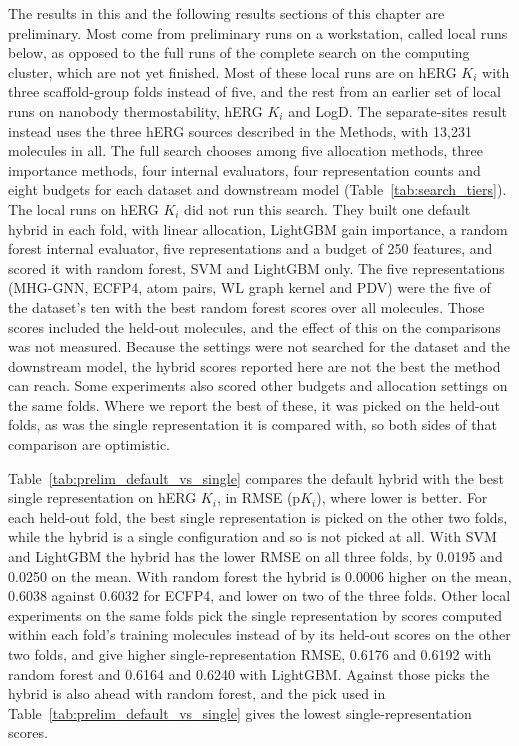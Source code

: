 \label{sec:method:results_single}


The results in this and the following results sections of this chapter are preliminary. Most come from preliminary runs on a workstation, called local runs below, as opposed to the full runs of the complete search on the computing cluster, which are not yet finished. Most of these local runs are on hERG $K_i$ with three scaffold-group folds instead of five, and the rest from an earlier set of local runs on nanobody thermostability, hERG $K_i$ and LogD. The separate-sites result instead uses the three hERG sources described in the Methods, with 13,231 molecules in all. The full search chooses among five allocation methods, three importance methods, four internal evaluators, four representation counts and eight budgets for each dataset and downstream model (Table~\ref{tab:search_tiers}). The local runs on hERG $K_i$ did not run this search. They built one default hybrid in each fold, with linear allocation, LightGBM gain importance, a random forest internal evaluator, five representations and a budget of 250 features, and scored it with random forest, SVM and LightGBM only. The five representations (MHG-GNN, ECFP4, atom pairs, WL graph kernel and PDV) were the five of the dataset's ten with the best random forest scores over all molecules. Those scores included the held-out molecules, and the effect of this on the comparisons was not measured. Because the settings were not searched for the dataset and the downstream model, the hybrid scores reported here are not the best the method can reach. Some experiments also scored other budgets and allocation settings on the same folds. Where we report the best of these, it was picked on the held-out folds, as was the single representation it is compared with, so both sides of that comparison are optimistic.

Table~\ref{tab:prelim_default_vs_single} compares the default hybrid with the best single representation on hERG $K_i$, in RMSE (p$K_i$), where lower is better. For each held-out fold, the best single representation is picked on the other two folds, while the hybrid is a single configuration and so is not picked at all. With SVM and LightGBM the hybrid has the lower RMSE on all three folds, by 0.0195 and 0.0250 on the mean. With random forest the hybrid is 0.0006 higher on the mean, 0.6038 against 0.6032 for ECFP4, and lower on two of the three folds. Other local experiments on the same folds pick the single representation by scores computed within each fold's training molecules instead of by its held-out scores on the other two folds, and give higher single-representation RMSE, 0.6176 and 0.6192 with random forest and 0.6164 and 0.6240 with LightGBM. Against those picks the hybrid is also ahead with random forest, and the pick used in Table~\ref{tab:prelim_default_vs_single} gives the lowest single-representation scores.

